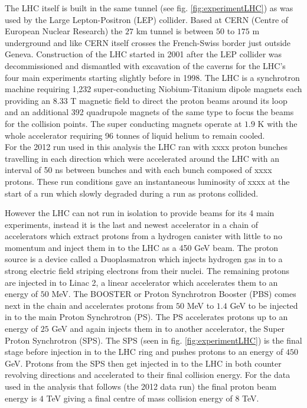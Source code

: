 	The LHC itself is built in the same tunnel (see fig. \ref{fig:experimentLHC}) as was used by the Large Lepton-Positron (LEP) collider. Based at CERN (Centre of European Nuclear Research) the $27$ km tunnel is between $50$ to $175$ m underground and like CERN itself crosses the French-Swiss border just outside Geneva. Construction of the LHC started in 2001 after the LEP collider was decommissioned and dismantled with excavation of the caverns for the LHC's four main experiments starting slightly before in 1998. 
	The LHC is a synchrotron machine requiring 1,232 super-conducting Niobium-Titanium dipole magnets each providing an $8.33$ T magnetic field to direct the proton beams around its loop and an additional 392 quadrupole magnets of the same type to focus the beams for the collision points. The super conducting magnets operate at $1.9$ K with the whole accelerator requiring 96 tonnes of liquid helium to remain cooled.\\

	For the 2012 run used in this analysis the LHC ran with xxxx proton bunches travelling in each direction which were accelerated around the LHC with an interval of 50 ns between bunches and with each bunch composed of xxxx protons. These run conditions gave an instantaneous luminosity of xxxx at the start of a run which slowly degraded during a run as protons collided. %

	However the LHC can not run in isolation to provide beams for its 4 main experiments, instead it is the last and newest accelerator in a chain of accelerators which extract protons from a hydrogen canister with little to no momentum and inject them in to the LHC as a 450 GeV beam.
	The proton source is a device called a Duoplasmatron which injects hydrogen gas in to a strong electric field striping electrons from their nuclei. The remaining protons are injected in to Linac 2, a linear accelerator which accelerates them to an energy of $50$ MeV. The BOOSTER or Proton Synchrotron Booster (PBS) comes next in the chain and accelerates protons from $50$ MeV to $1.4$ GeV to be injected in to the main Proton Synchrotron (PS). The PS accelerates protons up to an energy of $25$ GeV and again injects them in to another accelerator, the Super Proton Synchrotron (SPS). The SPS (seen in fig. \ref{fig:experimentLHC}) is the final stage before injection in to the LHC ring and pushes protons to an energy of $450$ GeV. Protons from the SPS then get injected in to the LHC in both counter revolving directions and accelerated to their final collision energy. For the data used in the analysis that follows (the 2012 data run) the final proton beam energy is $4$ TeV giving a final centre of mass collision energy of $8$ TeV.


